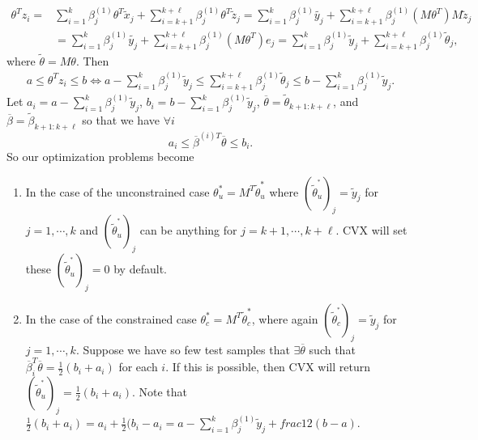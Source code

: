 \documentclass[12pt]{article}
\begin{document}
\begin{align*}
\theta^{T} z_{i} = & \sum \limits_{i=1}^{k} \beta_{j}^{(1)} \theta^{T} \tilde{x}_{j} + \sum \limits_{i=k+1}^{k + \ell} \beta_{j}^{(1)}  \theta^{T} \tilde{z}_{j}  = \sum \limits_{i=1}^{k} \beta_{j}^{(1)} \tilde{y_{j}} + \sum \limits_{i=k+1}^{k + \ell} \beta_{j}^{(1)}  (M\theta^{T})M \tilde{z}_{j} \\
& = \sum \limits_{i=1}^{k} \beta_{j}^{(1)} \tilde{y_{j}} + \sum \limits_{i=k+1}^{k + \ell} \beta_{j}^{(1)}  (M\theta^{T})e_{j} = \sum \limits_{i=1}^{k} \beta_{j}^{(1)} \tilde{y}_{j} + \sum \limits_{i=k+1}^{k + \ell} \beta_{j}^{(1)}  \tilde{\theta}_{j},
\end{align*}
where $\tilde{\theta} = M\theta$. Then 
\begin{align*}
a \leq \theta^{T}z_{i} \leq b \iff  a- \sum \limits_{i=1}^{k} \beta_{j}^{(1)} \tilde{y}_{j}  \leq \sum \limits_{i=k+1}^{k + \ell} \beta_{j}^{(1)}  \tilde{\theta}_{j} \leq b -  \sum \limits_{i=1}^{k} \beta_{j}^{(1)} \tilde{y}_{j}.
\end{align*}
Let $a_{i} = a- \sum \limits_{i=1}^{k} \beta_{j}^{(1)} \tilde{y}_{j} $, $b_{i} = b -  \sum \limits_{i=1}^{k} \beta_{j}^{(1)} \tilde{y}_{j}$,  $\overline{\theta} = \tilde{\theta}_{k+1:k+\ell}$, and $\overline{\beta} = \tilde{\beta}_{k+1:k+\ell}$ so that we have $\forall i$
\begin{equation}
a_{i} \leq \overline{\beta}^{(i)T} \overline{\theta} \leq b_{i}.
\end{equation}
So our optimization problems become 
\begin{enumerate}
\item In the case of the unconstrained case $\theta^{*}_{u} = M^{T}\tilde{\theta}^{*}_{u}$ where $(\tilde{\theta}^{^{*}}_{u})_{j}= \tilde{y}_{j}$ for $j = 1, \cdots, k$ and $(\tilde{\theta}^{^{*}}_{u})_{j}$ can be anything for $j = k+1, \cdots, k+ \ell$. CVX will set these $(\tilde{\theta}^{^{*}}_{u})_{j} = 0$ by default. \\
\item In the case of the constrained case $\theta^{*}_{c} = M^{T}\tilde{\theta}^{*}_{c}$, where again $(\tilde{\theta}^{^{*}}_{c})_{j}= \tilde{y}_{j}$ for $j = 1, \cdots, k$. Suppose we have so few test samples that $\exists \overline{\theta}$ such that $\overline{\beta}_{i}^{T} \overline{\theta} = \frac{1}{2}(b_{i} + a_{i})$ for each $i$. If this is possible, then CVX will return $(\tilde{\theta}^{^{*}}_{u})_{j}  = \frac{1}{2}(b_{i} + a_{i})$. Note that $\frac{1}{2}(b_{i} + a_{i}) = a_{i} + \frac{1}{2}(b_{i} - a_{i} =  a- \sum \limits_{i=1}^{k} \beta_{j}^{(1)} \tilde{y}_{j} + frac{1}{2}(b-a)$.
\end{enumerate}
\end{document}
